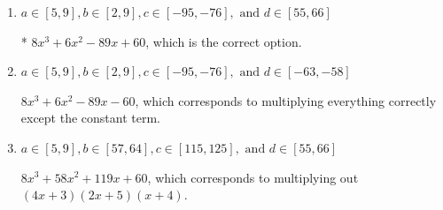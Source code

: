 \documentclass{extbook}[14pt]
\begin{document}
\begin{enumerate}
{\begin{enumerate}[label=\Alph*.]
$8x^{3} -6 x^{2} -89 x -60$, which corresponds to multiplying out $(4x + 3)(2x + 5)(x -4)$.
\item \( a \in [5, 9], b \in [2, 9], c \in [-95, -76], \text{ and } d \in [55, 66] \)

* $8x^{3} +6 x^{2} -89 x + 60$, which is the correct option.
\item \( a \in [5, 9], b \in [2, 9], c \in [-95, -76], \text{ and } d \in [-63, -58] \)

$8x^{3} +6 x^{2} -89 x -60$, which corresponds to multiplying everything correctly except the constant term.
\item \( a \in [5, 9], b \in [57, 64], c \in [115, 125], \text{ and } d \in [55, 66] \)

$8x^{3} +58 x^{2} +119 x + 60$, which corresponds to multiplying out $(4x + 3)(2x + 5)(x + 4)$.
\end{enumerate}

}
\end{enumerate}
\end{document}
